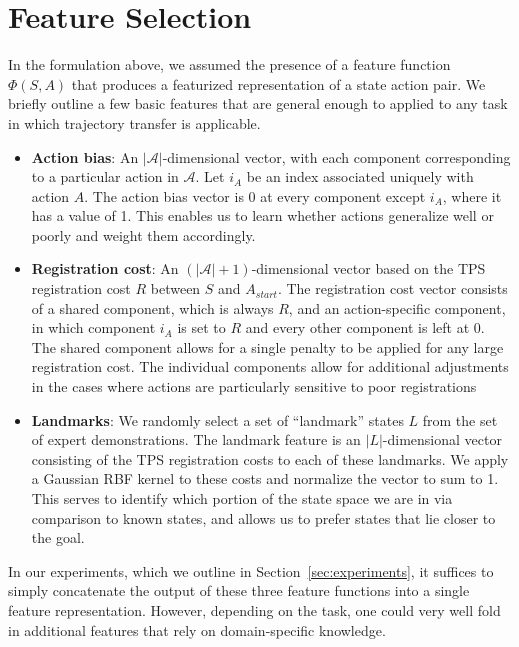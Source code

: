 \section{Feature Selection}
\label{sec:features}

In the formulation above, we assumed the presence of a feature function
$\Phi(S,A)$ that produces a featurized representation of a state action pair.
We briefly outline a few basic features that are general enough to applied to
any task in which trajectory transfer is applicable. 

\begin{itemize}
  \item \textbf{Action bias}: An $|\mathcal{A}|$-dimensional vector, with each
    component corresponding to a particular action in $\mathcal{A}$. Let $i_A$
    be an index associated uniquely with action $A$. The action bias vector is 0
    at every component except $i_A$, where it has a value of 1. This enables us
    to learn whether actions generalize well or poorly and weight them
    accordingly.
  \item \textbf{Registration cost}: An $(|\mathcal{A}|+1)$-dimensional vector
    based on the TPS registration cost $R$ between $S$ and $A_{start}$. The
    registration cost vector consists of a shared component, which is always
    $R$, and an action-specific component, in which component $i_A$ is set to
    $R$ and every other component is left at 0. The shared component allows for
    a single penalty to be applied for any large registration cost. The
    individual components allow for additional adjustments in the cases where
    actions are particularly sensitive to poor registrations
  \item \textbf{Landmarks}: We randomly select a set of ``landmark'' states $L$
    from the set of expert demonstrations. The landmark feature is an
    $|L|$-dimensional vector consisting of the TPS registration costs to each of
    these landmarks. We apply a Gaussian RBF kernel to these costs and normalize
    the vector to sum to 1. This serves to identify which portion of the state
    space we are in via comparison to known states, and allows us to prefer
    states that lie closer to the goal.
\end{itemize}

In our experiments, which we outline in Section~\ref{sec:experiments}, it
suffices to simply concatenate the output of these three feature functions into
a single feature representation. However, depending on the task, one could
very well fold in additional features that rely on domain-specific knowledge.
